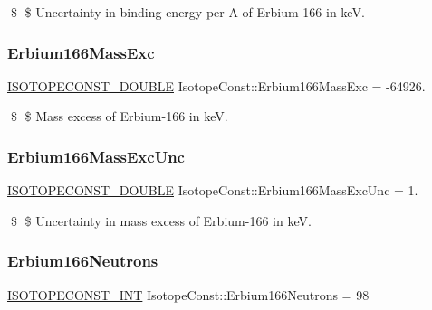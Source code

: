 \$ \$ Uncertainty in binding energy per A of Erbium-\/166 in keV. \mbox{\label{group___isotope_const-_erbium-_er166_ga5c2be6e42ba2cfcada2ac979172ff19b}} 
\subsubsection{\texorpdfstring{Erbium166\+Mass\+Exc}{Erbium166MassExc}}
{\footnotesize\ttfamily \mbox{\hyperlink{group___isotope_const-_macros_ga8f45a7272ce02c0b4c65c44636ed719a}{I\+S\+O\+T\+O\+P\+E\+C\+O\+N\+S\+T\+\_\+\+D\+O\+U\+B\+LE}} Isotope\+Const\+::\+Erbium166\+Mass\+Exc = -\/64926.}

\$ \$ Mass excess of Erbium-\/166 in keV. \mbox{\label{group___isotope_const-_erbium-_er166_ga292a5d9ad54755ea2759c5b4d6e169ab}} 
\subsubsection{\texorpdfstring{Erbium166\+Mass\+Exc\+Unc}{Erbium166MassExcUnc}}
{\footnotesize\ttfamily \mbox{\hyperlink{group___isotope_const-_macros_ga8f45a7272ce02c0b4c65c44636ed719a}{I\+S\+O\+T\+O\+P\+E\+C\+O\+N\+S\+T\+\_\+\+D\+O\+U\+B\+LE}} Isotope\+Const\+::\+Erbium166\+Mass\+Exc\+Unc = 1.}

\$ \$ Uncertainty in mass excess of Erbium-\/166 in keV. \mbox{\label{group___isotope_const-_erbium-_er166_ga3ab56a9f18e031ac4994b84ed3e4c48d}} 
\subsubsection{\texorpdfstring{Erbium166\+Neutrons}{Erbium166Neutrons}}
{\footnotesize\ttfamily \mbox{\hyperlink{group___isotope_const-_macros_ga5f18360b3e99483a35c32d789e62621c}{I\+S\+O\+T\+O\+P\+E\+C\+O\+N\+S\+T\+\_\+\+I\+NT}} Isotope\+Const\+::\+Erbium166\+Neutrons = 98}

